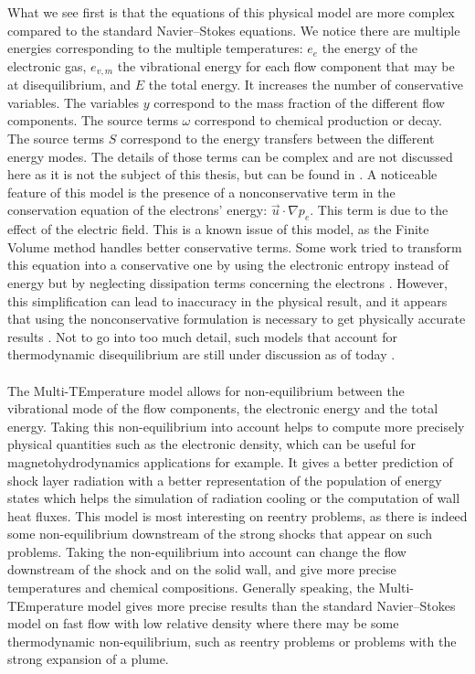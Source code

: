       What we see first is that the equations of this physical model are more complex compared to the standard Navier--Stokes equations.
      We notice there are multiple energies corresponding to the multiple temperatures: $e_e$ the energy of the electronic gas, $e_{v, m}$ the vibrational energy for each flow component that may be at disequilibrium, and $E$ the total energy.
      It increases the number of conservative variables.
      The variables $y$ correspond to the mass fraction of the different flow components.
      The source terms $\omega$ correspond to chemical production or decay.
      The source terms $S$ correspond to the energy transfers between the different energy modes.
      The details of those terms can be complex and are not discussed here as it is not the subject of this thesis, but can be found in \cite{Soubrie2006}.
      A noticeable feature of this model is the presence of a nonconservative term in the conservation equation of the electrons' energy: $\vec{u} \cdot \nabla p_e$.
      This term is due to the effect of the electric field.
      This is a known issue of this model, as the Finite Volume method handles better conservative terms.
      Some work tried to transform this equation into a conservative one by using the electronic entropy instead of energy but by neglecting dissipation terms concerning the electrons \cite{CoquelMarmignon1995}.
      However, this simplification can lead to inaccuracy in the physical result, and it appears that using the nonconservative formulation is necessary to get physically accurate results \cite{Soubrie2006, KimGuelhanBoyd2012}.
      Not to go into too much detail, such models that account for thermodynamic disequilibrium are still under discussion as of today \cite{BlancoJosyula2020}.

      \paragraph{}
      The Multi-TEmperature model allows for non-equilibrium between the vibrational mode of the flow components, the electronic energy and the total energy.
      Taking this non-equilibrium into account helps to compute more precisely physical quantities such as the electronic density, which can be useful for magnetohydrodynamics applications for example.
      It gives a better prediction of shock layer radiation with a better representation of the population of energy states which helps the simulation of radiation cooling or the computation of wall heat fluxes.
      This model is most interesting on reentry problems, as there is indeed some non-equilibrium downstream of the strong shocks that appear on such problems.
      Taking the non-equilibrium into account can change the flow downstream of the shock and on the solid wall, and give more precise temperatures and chemical compositions.
      Generally speaking, the Multi-TEmperature model gives more precise results than the standard Navier--Stokes model on fast flow with low relative density where there may be some thermodynamic non-equilibrium, such as reentry problems or problems with the strong expansion of a plume.


